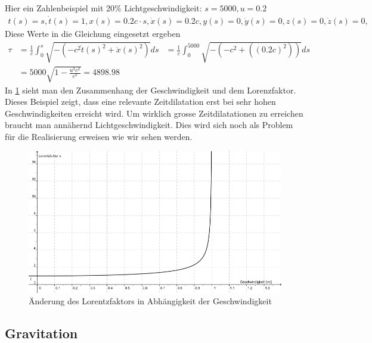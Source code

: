 \begin{refsection}
Hier ein Zahlenbeispiel mit 20\% Lichtgeschwindigkeit:
$s=5000, u=0.2$ 
\begin{align*}
    t(s)=s, \dot{t}(s)=1,
    x(s)=0.2c \cdot s, \dot{x}(s)=0.2c,
    y(s)=0, \dot{y}(s)=0,
    z(s)=0, \dot{z}(s)=0,
\end{align*}
Diese Werte in die Gleichung eingesetzt ergeben
\begin{align*}
    \tau
    &=
    \frac{1}{c}\int_{0}^{s}\sqrt{-(-c^2\dot{t}(s)^2+\dot{x}(s)^2)}ds
    &=
    \frac{1}{c}\int_{0}^{5000}\sqrt{-(-c^2+((0.2c)^2))}ds\\
    &=
    5000\sqrt{1-\frac{u^2 c^2}{c^2}} = 4898.98
\end{align*}
In \ref{skript:zeitreisen:fig:lorentz}  sieht man den Zusammenhang der Geschwindigkeit und dem Lorenzfaktor. Dieses Beispiel zeigt, dass eine relevante Zeitdilatation erst bei sehr hohen Geschwindigkeiten erreicht wird. Um wirklich grosse Zeitdilatationen zu erreichen braucht man annähernd Lichtgeschwindigkeit. Dies wird sich noch als Problem für die Realisierung erweisen wie wir sehen werden.
\begin{figure}[H]
    \centering
    \includegraphics[width=\hsize]{zeitreisen/Lorentzfaktor.jpg}
    \caption{Änderung des Lorentzfaktors in Abh\"angigkeit der Geschwindigkeit}
        \label{skript:zeitreisen:fig:lorentz} 
\end{figure}
\subsection{Gravitation}


\end{refsection}
